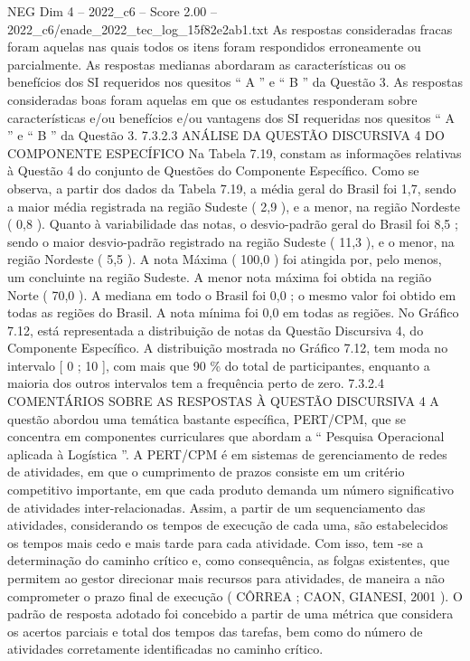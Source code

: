 \begin{textsample}{NEG Dim 4 – 2022\_c6 – Score 2.00 – 2022\_c6/enade\_2022\_tec\_log\_15f82e2ab1.txt}
As respostas consideradas fracas foram aquelas nas quais todos os itens foram respondidos erroneamente ou parcialmente.
As respostas medianas abordaram as características ou os benefícios dos SI requeridos nos quesitos “ A ” e “ B ” da Questão 3.
As respostas consideradas boas foram aquelas em que os estudantes responderam sobre características e/ou benefícios e/ou vantagens dos SI requeridas nos quesitos “ A ” e “ B ” da Questão 3. 7.3.2.3 ANÁLISE DA QUESTÃO DISCURSIVA 4 DO COMPONENTE ESPECÍFICO Na Tabela 7.19, constam as informações relativas à Questão 4 do conjunto de Questões do Componente Específico.
Como se observa, a partir dos dados da Tabela 7.19, a média geral do Brasil foi 1,7, sendo a maior média registrada na região Sudeste ( 2,9 ), e a menor, na região Nordeste ( 0,8 ).
Quanto à variabilidade das notas, o desvio-padrão geral do Brasil foi 8,5 ; sendo o maior desvio-padrão registrado na região Sudeste ( 11,3 ), e o menor, na região Nordeste ( 5,5 ).
A nota Máxima ( 100,0 ) foi atingida por, pelo menos, um concluinte na região Sudeste.
A menor nota máxima foi obtida na região Norte ( 70,0 ).
A mediana em todo o Brasil foi 0,0 ; o mesmo valor foi obtido em todas as regiões do Brasil.
A nota mínima foi 0,0 em todas as regiões.
No Gráfico 7.12, está representada a distribuição de notas da Questão Discursiva 4, do Componente Específico.
A distribuição mostrada no Gráfico 7.12, tem moda no intervalo [ 0 ; 10 ], com mais que 90 \% do total de participantes, enquanto a maioria dos outros intervalos tem a frequência perto de zero. 7.3.2.4 COMENTÁRIOS SOBRE AS RESPOSTAS À QUESTÃO DISCURSIVA 4 A questão abordou uma temática bastante específica, PERT/CPM, que se concentra em componentes curriculares que abordam a “ Pesquisa Operacional aplicada à Logística ”.
A PERT/CPM é em sistemas de gerenciamento de redes de atividades, em que o cumprimento de prazos consiste em um critério competitivo importante, em que cada produto demanda um número significativo de atividades inter-relacionadas.
Assim, a partir de um sequenciamento das atividades, considerando os tempos de execução de cada uma, são estabelecidos os tempos mais cedo e mais tarde para cada atividade.
Com isso, tem -se a determinação do caminho crítico e, como consequência, as folgas existentes, que permitem ao gestor direcionar mais recursos para atividades, de maneira a não comprometer o prazo final de execução ( CÔRREA ; CAON, GIANESI, 2001 ).
O padrão de resposta adotado foi concebido a partir de uma métrica que considera os acertos parciais e total dos tempos das tarefas, bem como do número de atividades corretamente identificadas no caminho crítico.

\end{textsample}
